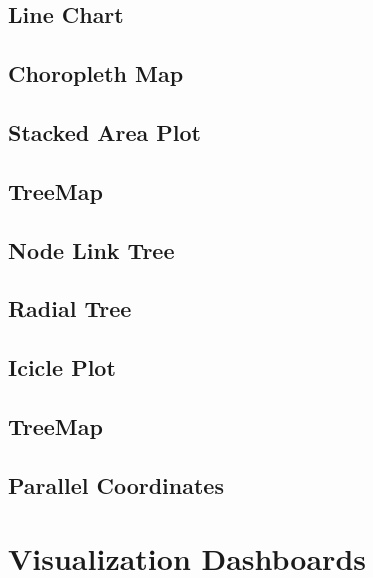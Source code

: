 \documentclass[12pt]{report}
\begin{document}
\begin{doublespace}
\subsection{Line Chart}
\subsection{Choropleth Map}
\subsection{Stacked Area Plot}
\subsection{TreeMap}
\subsection{Node Link Tree}
\subsection{Radial Tree}
\subsection{Icicle Plot}
\subsection{TreeMap}
\subsection{Parallel Coordinates}

\pagebreak
\section{Visualization Dashboards}



\end{doublespace}
\end{document}
